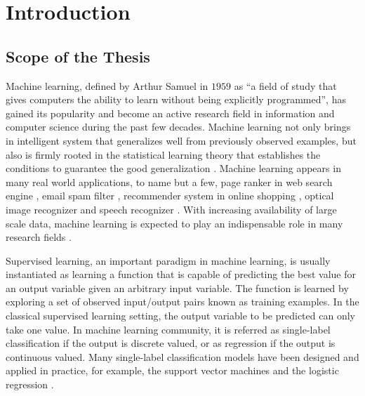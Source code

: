 




%
%
\chapter{Introduction}\label{ch_introduction}



%
%
\section{Scope of the Thesis}

Machine learning, defined by Arthur Samuel in $1959$ as ``a field of study that gives computers the ability to learn without being explicitly programmed'', has gained its popularity and become an active research field in information and computer science during the past few decades.
Machine learning not only brings in intelligent system that generalizes well from previously observed examples, but also is firmly rooted in the statistical learning theory that establishes the conditions to guarantee the good generalization \citep{Vapnik98statistical,Vapnik99an}.
Machine learning appears in many real world applications, to name but a few, page ranker in web search engine \citep{Richardson06beyond}, email spam filter \citep{Goodman06online}, recommender system in online shopping \citep{Bell07lessons}, optical image recognizer and speech recognizer \citep{Bengio09learning}.
With increasing availability of large scale data, machine learning is expected to play an indispensable role in many research fields \citep{Fan13mining}.

Supervised learning, an important paradigm in machine learning, is usually instantiated as learning a function that is capable of predicting the best value for an output variable given an arbitrary input variable.
The function is learned by exploring a set of observed input/output pairs known as training examples.
In the classical supervised learning setting, the output variable to be predicted can only take one value.
In machine learning community, it is referred as single-label classification if the output is discrete valued, or as regression if the output is continuous valued.
Many single-label classification models have been designed and applied in practice, for example, the support vector machines \citep{Boser92,Cortes95support} and the logistic regression \citep{Chen99,Chen00,Goodman03}.

